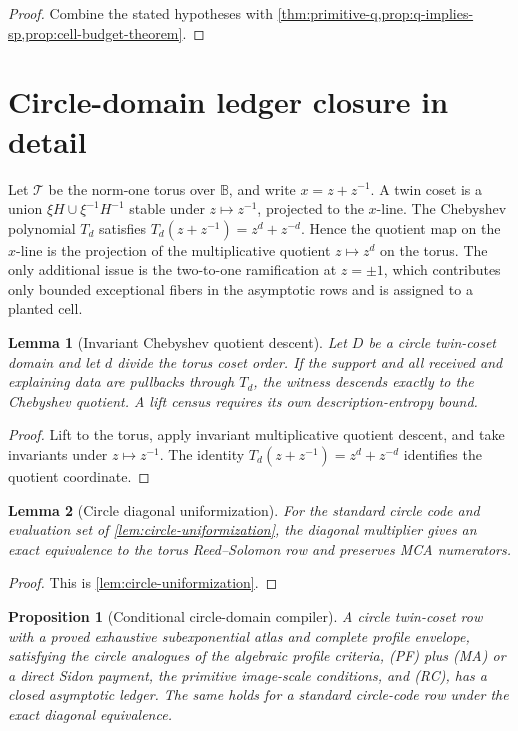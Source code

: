 \documentclass[12pt,a4paper]{amsart}
\numberwithin{equation}{section}
\newtheorem{proposition}[proposition]{Proposition}
\newtheorem{lemma}[lemma]{Lemma}
\theoremstyle{remark}
\newcommand{\B}{\mathbb B}
\newcommand{\Tcal}{\mathcal T}
\begin{document}
\begin{proof}
Combine the stated hypotheses with
\cref{thm:primitive-q,prop:q-implies-sp,prop:cell-budget-theorem}.
\end{proof}

\section{Circle-domain ledger closure in detail}\label{sec:circle-domain-detail}

Let \(\Tcal\) be the norm-one torus over \(\B\), and write \(x=z+z^{-1}\).  A twin coset is a union \(\xi H\cup \xi^{-1}H^{-1}\) stable under \(z\mapsto z^{-1}\), projected to the \(x\)-line.  The Chebyshev polynomial \(T_d\) satisfies \(T_d(z+z^{-1})=z^d+z^{-d}\).  Hence the quotient map on the \(x\)-line is the projection of the multiplicative quotient \(z\mapsto z^d\) on the torus.  The only additional issue is the two-to-one ramification at \(z=\pm1\), which contributes only bounded exceptional fibers in the asymptotic rows and is assigned to a planted cell.

\begin{lemma}[Invariant Chebyshev quotient descent]\label{lem:chebyshev-descent}
Let \(D\) be a circle twin-coset domain and let \(d\) divide the torus
coset order.  If the support and all received and explaining data are
pullbacks through \(T_d\), the witness descends exactly to the Chebyshev
quotient.  A lift census requires its own description-entropy bound.
\end{lemma}

\begin{proof}
Lift to the torus, apply invariant multiplicative quotient descent, and take
invariants under \(z\mapsto z^{-1}\).  The identity
\(T_d(z+z^{-1})=z^d+z^{-d}\) identifies the quotient coordinate.
\end{proof}

\begin{lemma}[Circle diagonal uniformization]\label{lem:circle-diagonal-uniformization}
For the standard circle code and evaluation set of
\cref{lem:circle-uniformization}, the diagonal multiplier gives an exact
equivalence to the torus Reed--Solomon row and preserves MCA numerators.
\end{lemma}

\begin{proof}
This is \cref{lem:circle-uniformization}.
\end{proof}

\begin{proposition}[Conditional circle-domain compiler]\label{prop:circle-domain-full-ledger}
A circle twin-coset row with a proved exhaustive subexponential atlas and
complete profile envelope, satisfying the circle analogues of the
algebraic profile criteria, \textup{(PF)} plus \textup{(MA)} or a direct
Sidon payment, the primitive image-scale conditions, and \textup{(RC)},
has a closed asymptotic ledger.  The same holds for a standard circle-code
row under the exact diagonal equivalence.
\end{proposition}
\end{document}

